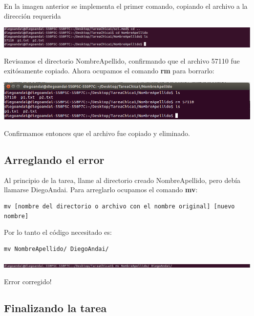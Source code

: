 \documentclass[a4paper,11pt]{article}
\theoremstyle{mytheor}
\begin{document}
En la imagen anterior se implementa el primer comando, copiando el archivo a la dirección requerida

\begin{center}
\includegraphics[scale=0.385]{tc1_paso9(2).png}
\end{center}

Revisamos el directorio NombreApellido, confirmando que el archivo 57110 fue exitósamente copiado. Ahora ocupamos el comando \textbf{rm} para borrarlo:

\begin{center}
\includegraphics[scale=0.475]{tc1_paso9(3).png}
\end{center}

Confirmamos entonces que el archivo fue copiado y eliminado.

\subsection{Arreglando el error}

Al principio de la tarea, llame al directorio creado NombreApellido, pero debía llamarse DiegoAndai. Para arreglarlo ocupamos el comando \textbf{mv}:

\begin{lstlisting}
mv [nombre del directorio o archivo con el nombre original] [nuevo nombre]
\end{lstlisting}

Por lo tanto el código necesitado es:

\begin{lstlisting}
mv NombreApellido/ DiegoAndai/
\end{lstlisting}

\begin{center}
\includegraphics[scale=0.385]{tc1_error.png}
\end{center}

Error corregido!


\subsection{Finalizando la tarea}
\end{document}
